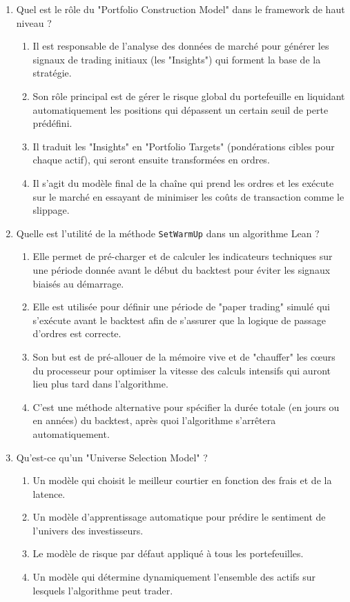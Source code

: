 \documentclass[a4paper,12pt]{article}
\begin{document}
\begin{enumerate}
    \item Quel est le rôle du "Portfolio Construction Model" dans le framework de haut niveau ?
    \begin{enumerate}[label=(\Alph*)]
        \item Il est responsable de l'analyse des données de marché pour générer les signaux de trading initiaux (les "Insights") qui forment la base de la stratégie.
        \item Son rôle principal est de gérer le risque global du portefeuille en liquidant automatiquement les positions qui dépassent un certain seuil de perte prédéfini.
        \item Il traduit les "Insights" en "Portfolio Targets" (pondérations cibles pour chaque actif), qui seront ensuite transformées en ordres.
        \item Il s'agit du modèle final de la chaîne qui prend les ordres et les exécute sur le marché en essayant de minimiser les coûts de transaction comme le slippage.
    \end{enumerate}
    
    \item Quelle est l'utilité de la méthode \texttt{SetWarmUp} dans un algorithme Lean ?
    \begin{enumerate}[label=(\Alph*)]
        \item Elle permet de pré-charger et de calculer les indicateurs techniques sur une période donnée avant le début du backtest pour éviter les signaux biaisés au démarrage.
        \item Elle est utilisée pour définir une période de "paper trading" simulé qui s'exécute avant le backtest afin de s'assurer que la logique de passage d'ordres est correcte.
        \item Son but est de pré-allouer de la mémoire vive et de "chauffer" les cœurs du processeur pour optimiser la vitesse des calculs intensifs qui auront lieu plus tard dans l'algorithme.
        \item C'est une méthode alternative pour spécifier la durée totale (en jours ou en années) du backtest, après quoi l'algorithme s'arrêtera automatiquement.
    \end{enumerate}

    \item Qu'est-ce qu'un "Universe Selection Model" ?
    \begin{enumerate}[label=(\Alph*)]
        \item Un modèle qui choisit le meilleur courtier en fonction des frais et de la latence.
        \item Un modèle d'apprentissage automatique pour prédire le sentiment de l'univers des investisseurs.
        \item Le modèle de risque par défaut appliqué à tous les portefeuilles.
        \item Un modèle qui détermine dynamiquement l'ensemble des actifs sur lesquels l'algorithme peut trader.
    \end{enumerate}
    

\end{enumerate}
\end{document}
